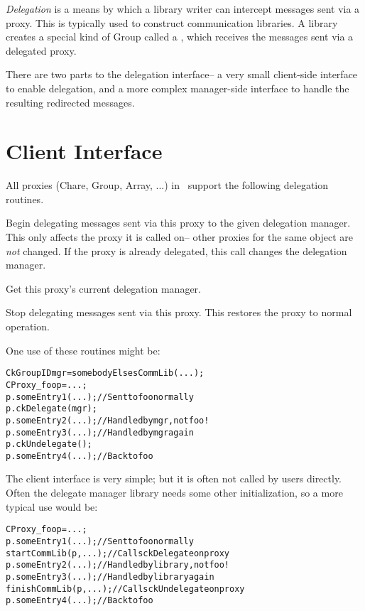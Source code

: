 {\em Delegation} is a means by which a library writer can 
intercept messages sent via a proxy.  This is typically
used to construct communication libraries.
A library creates a special kind of Group called a 
, which receives the messages
sent via a delegated proxy.

There are two parts to the delegation interface-- a
very small client-side interface to enable delegation,
and a more complex manager-side interface to handle
the resulting redirected messages.

\section{Client Interface}

All proxies (Chare, Group, Array, ...) in \charmpp\ 
support the following delegation routines.

Begin delegating messages sent via this proxy to the
given delegation manager. This only affects
the proxy it is called on-- other proxies for the
same object are {\em not} changed. If the proxy is 
already delegated, this call changes the delegation manager.

Get this proxy's current delegation manager.

Stop delegating messages sent via this proxy.  
This restores the proxy to normal operation.

One use of these routines might be:

\begin{alltt}
  CkGroupID mgr=somebodyElsesCommLib(...);
  CProxy_foo p=...;
  p.someEntry1(...); //Sent to foo normally
  p.ckDelegate(mgr);
  p.someEntry2(...); //Handled by mgr, not foo!
  p.someEntry3(...); //Handled by mgr again
  p.ckUndelegate();
  p.someEntry4(...); //Back to foo
\end{alltt}

The client interface is very simple; but it is often
not called by users directly.  Often the delegate 
manager library needs some other initialization,
so a more typical use would be:

\begin{alltt}
  CProxy_foo p=...;
  p.someEntry1(...); //Sent to foo normally
  startCommLib(p,...); // Calls ckDelegate on proxy
  p.someEntry2(...); //Handled by library, not foo!
  p.someEntry3(...); //Handled by library again
  finishCommLib(p,...); // Calls ckUndelegate on proxy
  p.someEntry4(...); //Back to foo
\end{alltt}

